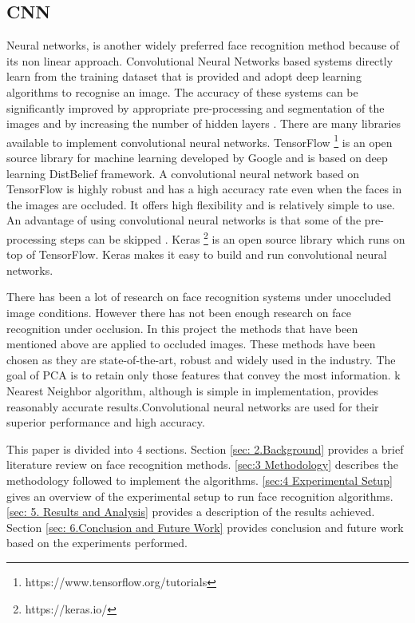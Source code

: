 \documentclass[conference]{IEEEtran}
\begin{document}
\subsection{CNN}
\label{subsec: 1d.CNN}
Neural networks, is another widely preferred face recognition method because of its non linear approach. Convolutional Neural Networks based systems directly learn from the training dataset that is provided and adopt deep learning algorithms to recognise an image. The accuracy of these systems can be significantly improved by appropriate pre-processing and segmentation of the images and by increasing the number of hidden layers \cite{dean2012large}.
There are many libraries available to implement convolutional neural networks\cite{2016arXiv160502688short}\cite{Jia:2014:CCA:2647868.2654889}\cite{tensorflow2015-whitepaper}. TensorFlow \footnote{https://www.tensorflow.org/tutorials} is an open source library for machine learning developed by Google and is based on deep learning DistBelief framework. A convolutional neural network based on TensorFlow is highly robust and has a high accuracy rate even when the faces in the images are occluded.  It offers high flexibility and is relatively simple to use\cite{tensorflow2015-whitepaper}. An advantage of using convolutional neural networks is that some of the pre-processing steps can be skipped \cite{oliveira2017irish}. Keras \footnote{https://keras.io/} is an open source library which runs on top of TensorFlow. Keras makes it easy to build and run convolutional neural networks\cite{chollet2015keras}. 

There has been a lot of research on face recognition systems under unoccluded image conditions. However there has not been enough research on face recognition under occlusion. In this project the methods that have been mentioned above are applied to occluded images. These methods have been chosen as they are state-of-the-art, robust and widely used in the industry. The goal of PCA is to retain only those features that convey the most information\cite{turk1991face}. k Nearest Neighbor algorithm, although is simple in implementation, provides reasonably accurate results\cite{zhang2007ml}.Convolutional neural networks are used for their superior performance and high accuracy\cite{lawrence1997face}.



This paper is divided into 4 sections. Section \ref{sec: 2.Background} provides a brief literature review on face recognition methods. \ref{sec:3 Methodology} describes the methodology followed to implement the algorithms. \ref{sec:4 Experimental Setup} gives an overview of the experimental setup to run face recognition algorithms. \ref{sec: 5. Results and Analysis} provides a description of the results achieved. Section \ref{sec: 6.Conclusion and Future Work} provides conclusion and future work based on the experiments performed.
\end{document}

